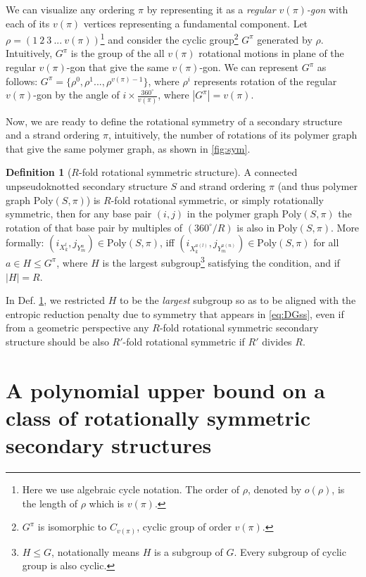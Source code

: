 \documentclass[11pt,letterpaper]{article}  \usepackage[margin=1in]{geometry}
\theoremstyle{definition}  \newtheorem{Definition}[theorem]{Definition}
\newcommand{\PolySpi}{\ensuremath{\mathrm{Poly}(S,\pi)}\xspace}
\begin{document}
We can visualize any ordering $\pi$ by representing it as a \emph{regular $v(\pi)$-gon} with each of its $v(\pi)$ vertices   representing a fundamental component. Let $\rho = (1 \ 2 \ 3 \ ... \ v(\pi))$\footnote{Here we use algebraic cycle notation.  
	The order of $\rho$, denoted by $o(\rho)$, is the length of $\rho$ which is $v(\pi)$.} and consider the cyclic group\footnote{$G^\pi$ is isomorphic to $C_{v(\pi)}$, cyclic group of order $v(\pi)$.} $G^\pi$ generated by $\rho$. Intuitively, $G^\pi$ is the group of the all $v(\pi)$ rotational motions in plane of the regular $v(\pi)$-gon that give the same $v(\pi)$-gon. 
We can represent  $G^\pi$ as follows:  $G^\pi = \{\rho^0, \rho^1 ...,\rho^{v(\pi)-1}\}$, where $\rho^i$ represents rotation of the regular $v(\pi)$-gon by the angle of  
$i \times {\frac{360^{\circ}}{v(\pi)}}$, 
where  $|G^\pi| = v(\pi)$.


Now, we are ready to define the rotational symmetry of a secondary structure and a strand ordering $\pi$, intuitively, the number of rotations of its polymer graph that give the same polymer graph, as shown in \cref{fig:sym}.


\begin{Definition}[$R$-fold rotational symmetric structure]  \label{def:sym}
	A connected unpseudoknotted secondary structure $S$ and strand ordering $\pi$ 
	(and thus polymer graph $\PolySpi$) 
	is $R$-fold rotational symmetric, 
	or simply rotationally symmetric, 
	then for any base pair $(i,j)$ in the polymer graph $\PolySpi$
	the rotation of that base pair by multiples of $(360^\circ/R)$ is also in $\PolySpi$. 
	More formally:   
	$(i_{X_k^l},j_{Y_m^n}) \in \PolySpi$,   
	iff 
	$(i_{X_k^{a(l)}}, j_{Y_m^{a(n)}}) \in \PolySpi$ for all $a \in H \! \leq \! G^\pi$, where $H$ is the largest subgroup\footnote{$H \leq G$, notationally means $H$ is a subgroup of $G$. Every subgroup of cyclic group is also cyclic.} satisfying the condition, and if $|H| = R$.  
\end{Definition}


\begin{remark}
	In Def. \ref{def:sym},	we restricted $H$ to be the {\em largest} subgroup so as to be aligned with the entropic reduction penalty due to symmetry that appears in \cref{eq:DGss}, even if  from a geometric perspective any $R$-fold rotational symmetric secondary structure should be also $R'$-fold rotational symmetric if $R'$ divides $R$. 
\end{remark}


\section{A polynomial upper bound on a class of rotationally symmetric secondary structures}\label{sec:ub}
\end{document}
